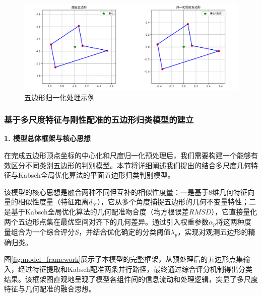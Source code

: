 \begin{figure}[H] %
    \centering      %
    \includegraphics[width=1\textwidth]{figures/pentagon_normalization.png}
    \caption{五边形归一化处理示例}
    \label{fig:normalize} %
\end{figure}

\subsubsection{基于多尺度特征与刚性配准的五边形归类模型的建立}

\textbf{1. 模型总体框架与核心思想}

在完成五边形顶点坐标的中心化和尺度归一化预处理后，我们需要构建一个能够有效区分不同类别五边形的判别模型。本节将详细阐述我们提出的结合多尺度几何特征与Kabsch全局优化算法的平面五边形归类判别模型。

该模型的核心思想是融合两种不同但互补的相似性度量：一是基于8维几何特征向量的相似性度量（特征距离$d_{\mathcal{F}}$），它从多个角度捕捉五边形的几何不变量特性；二是基于Kabsch全局优化算法的几何配准吻合度（均方根误差$RMSD$），它直接量化两个五边形点集在最优空间对齐下的几何差异。通过引入权重参数$\alpha_p$将这两种度量组合为一个综合评分$S$，并结合优化确定的分类阈值$\lambda_p$，实现对观测五边形的精确归类。

图\ref{fig:model_framework}展示了本模型的完整框架，从预处理后的五边形点集输入，经过特征提取和Kabsch配准两条并行路径，最终通过综合评分机制得出分类结果。该框架图直观地呈现了模型各组件间的信息流动和处理逻辑，突显了多尺度特征与几何配准的融合思想。

